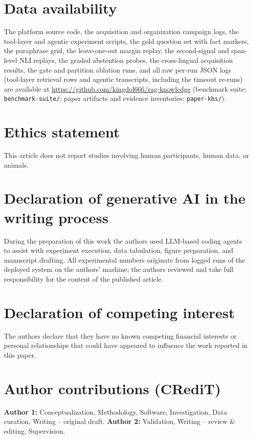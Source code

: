 \section*{Data availability}
The platform source code, the acquisition and organization campaign logs, the
tool-layer and agentic experiment scripts, the gold question set with fact
markers, the paraphrase grid, the leave-one-out margin replay, the
second-signal and span-level NLI replays, the graded abstention probes, the
cross-lingual acquisition results, the gate and partition ablation runs, and
all raw per-run JSON logs (tool-layer retrieval rows and agentic transcripts,
including the timeout re-runs) are available at
\url{https://github.com/kingdol666/rag-knowledge} (benchmark suite:
\texttt{benchmark-suite/}; paper artifacts and evidence inventories:
\texttt{paper-kbs/}).

\section*{Ethics statement}
This article does not report studies involving human participants, human
data, or animals.

\section*{Declaration of generative AI in the writing process}
During the preparation of this work the authors used LLM-based coding
agents to assist with experiment execution, data tabulation, figure
preparation, and manuscript drafting. All experimental numbers originate
from logged runs of the deployed system on the authors' machine; the
authors reviewed and take full responsibility for the content of the
published article.

\section*{Declaration of competing interest}
The authors declare that they have no known competing financial interests
or personal relationships that could have appeared to influence the work
reported in this paper.

\section*{Author contributions (CRediT)}
\textbf{Author 1:} Conceptualization, Methodology, Software, Investigation,
Data curation, Writing -- original draft. \textbf{Author 2:} Validation,
Writing -- review \& editing, Supervision. %

